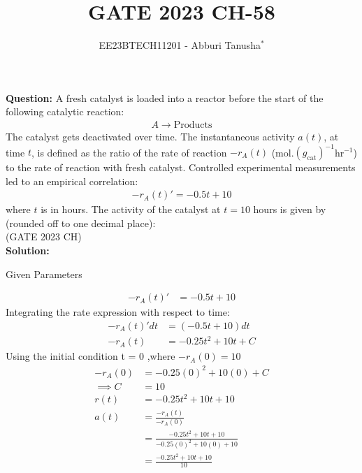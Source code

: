\documentclass[journal,12pt,twocolumn]{IEEEtran}
\theoremstyle{remark}
\begin{document}

\vspace{3cm}

\title{GATE 2023 CH-58}
\author{EE23BTECH11201 - Abburi Tanusha$^{*}$%
}
\maketitle
\newpage
\bigskip

\renewcommand{\thefigure}{\theenumi}
\renewcommand{\thetable}{\theenumi}

\vspace{3cm}

\maketitle
\textbf{Question:} 
A fresh catalyst is loaded into a reactor before the start of the following catalytic reaction:
\begin{align*}
  A \rightarrow \text{Products} 
\end{align*}
The catalyst gets deactivated over time. The instantaneous activity $a(t)$, at time $t$, is defined as the ratio of the rate of reaction $-r_A(t)$ (mol.$(g_{\text{cat}})^{-1}$hr$^{-1}$) to the rate of reaction with fresh catalyst. Controlled experimental measurements led to an empirical correlation:
\begin{align*}
 -r_A(t)' = -0.5t + 10
 \end{align*}
where $t$ is in hours.
The activity of the catalyst at $t=10$ hours is given by (rounded off to one decimal place):\\
\hfill(GATE 2023 CH)\\
\textbf{Solution:} 
\begin{table}[h!]
\centering
\resizebox{6cm}{!}{

}
\caption{Given Parameters}
\label{tab:my_label}
\end{table}
\begin{align}
 -r_A(t)' &= -0.5t + 10 
 \end{align}
Integrating the rate expression with respect to time:
\begin{align}
 -r_A(t)' dt &= (-0.5t + 10) dt \\
 -r_A(t) &= -0.25t^2 + 10t + C 
 \end{align}
Using the initial condition t = 0 ,where $-r_A(0) = 10$ \\
\begin{align}
 -r_A(0) &= -0.25(0)^2 + 10(0) + C \\
 \implies C &=10\\
r(t) &= -0.25t^2 + 10t + 10 \\
 a(t) &= \frac{-r_A(t)}{-r_A(0)} \\
  &= \frac{-0.25t^2 + 10t + 10}{-0.25(0)^2 + 10(0) + 10}\\ 
  &= \frac{-0.25t^2 + 10t + 10}{10} 
\end{align}
\end{document}
